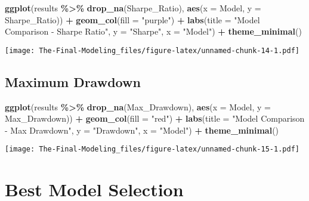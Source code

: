 \documentclass[
]{article}
\newenvironment{Shaded}{\begin{snugshade}}{\end{snugshade}}
\newcommand{\AttributeTok}[1]{\textcolor[rgb]{0.13,0.29,0.53}{#1}}
\newcommand{\FunctionTok}[1]{\textcolor[rgb]{0.13,0.29,0.53}{\textbf{#1}}}
\newcommand{\NormalTok}[1]{#1}
\newcommand{\SpecialCharTok}[1]{\textcolor[rgb]{0.81,0.36,0.00}{\textbf{#1}}}
\newcommand{\StringTok}[1]{\textcolor[rgb]{0.31,0.60,0.02}{#1}}
\begin{document}
\begin{Shaded}
\begin{Highlighting}[]
\FunctionTok{ggplot}\NormalTok{(results }\SpecialCharTok{\%\textgreater{}\%} \FunctionTok{drop\_na}\NormalTok{(Sharpe\_Ratio), }\FunctionTok{aes}\NormalTok{(}\AttributeTok{x =}\NormalTok{ Model, }\AttributeTok{y =}\NormalTok{ Sharpe\_Ratio)) }\SpecialCharTok{+}
  \FunctionTok{geom\_col}\NormalTok{(}\AttributeTok{fill =} \StringTok{"purple"}\NormalTok{) }\SpecialCharTok{+}
  \FunctionTok{labs}\NormalTok{(}\AttributeTok{title =} \StringTok{"Model Comparison {-} Sharpe Ratio"}\NormalTok{, }\AttributeTok{y =} \StringTok{"Sharpe"}\NormalTok{, }\AttributeTok{x =} \StringTok{"Model"}\NormalTok{) }\SpecialCharTok{+}
  \FunctionTok{theme\_minimal}\NormalTok{()}
\end{Highlighting}
\end{Shaded}

\texttt{[image: The-Final-Modeling\_files/figure-latex/unnamed-chunk-14-1.pdf]}

\subsection{Maximum Drawdown}\label{maximum-drawdown}

\begin{Shaded}
\begin{Highlighting}[]
\FunctionTok{ggplot}\NormalTok{(results }\SpecialCharTok{\%\textgreater{}\%} \FunctionTok{drop\_na}\NormalTok{(Max\_Drawdown), }\FunctionTok{aes}\NormalTok{(}\AttributeTok{x =}\NormalTok{ Model, }\AttributeTok{y =}\NormalTok{ Max\_Drawdown)) }\SpecialCharTok{+}
  \FunctionTok{geom\_col}\NormalTok{(}\AttributeTok{fill =} \StringTok{"red"}\NormalTok{) }\SpecialCharTok{+}
  \FunctionTok{labs}\NormalTok{(}\AttributeTok{title =} \StringTok{"Model Comparison {-} Max Drawdown"}\NormalTok{, }\AttributeTok{y =} \StringTok{"Drawdown"}\NormalTok{, }\AttributeTok{x =} \StringTok{"Model"}\NormalTok{) }\SpecialCharTok{+}
  \FunctionTok{theme\_minimal}\NormalTok{()}
\end{Highlighting}
\end{Shaded}

\texttt{[image: The-Final-Modeling\_files/figure-latex/unnamed-chunk-15-1.pdf]}

\section{Best Model Selection}\label{best-model-selection}
\end{document}
